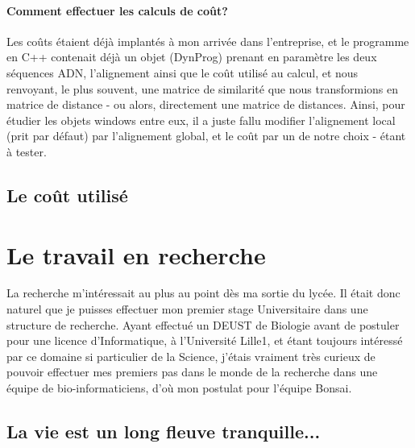 \documentclass[12pt]{report}
\begin{document}
\begin{spacing}{1.2}
\subsubsection{Comment effectuer les calculs de coût?}

Les coûts étaient déjà implantés à mon arrivée dans l'entreprise, et le programme en C++ contenait déjà un objet (DynProg) prenant en paramètre les deux séquences ADN, l'alignement ainsi que le coût utilisé au calcul, et nous renvoyant, le plus souvent, une matrice de similarité que nous transformions en matrice de distance - ou alors, directement une matrice de distances.
\newline
Ainsi, pour étudier les objets windows entre eux, il a juste fallu modifier l'alignement local (prit par défaut) par l'alignement global, et le coût par un de notre choix - étant à tester.

\section{Le coût utilisé}

\chapter{Le travail en recherche}

La recherche m'intéressait au plus au point dès ma sortie du lycée.
\newline
Il était donc naturel que je puisses effectuer mon premier stage Universitaire dans une structure de recherche. Ayant effectué un DEUST de Biologie avant de postuler pour une licence d'Informatique, à l'Université Lille1, et étant toujours intéressé par ce domaine si particulier de la Science, j'étais vraiment très curieux de pouvoir effectuer mes premiers pas dans le monde de la recherche dans une équipe de bio-informaticiens, d'où mon postulat pour l'équipe Bonsai.

\section{La vie est un long fleuve tranquille...}


\end{spacing}
\end{document}
